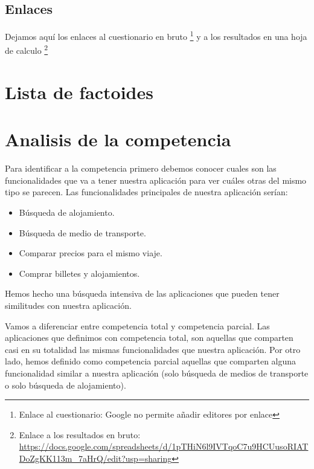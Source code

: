 \subsection{Enlaces}

Dejamos aquí los enlaces al cuestionario en bruto \footnote{Enlace al cuestionario: Google no permite añadir editores por enlace} y a los resultados en una hoja de calculo \footnote{ Enlace a los resultados en bruto: \url{https://docs.google.com/spreadsheets/d/1pTHiN6l9IVTqoC7u9HCUusoRIATDoZgKK113m_7aHrQ/edit?usp=sharing}}

\section{Lista de factoides}

\section{Analisis de la competencia}

Para identificar a la competencia primero debemos conocer cuales son las funcionalidades que va a tener nuestra aplicación para ver cuáles otras del mismo tipo se parecen. Las funcionalidades principales de nuestra aplicación serían:
\begin{itemize}
    \item Búsqueda de alojamiento.
    \item Búsqueda de medio de transporte.
    \item Comparar precios para el mismo viaje.
    \item Comprar billetes y alojamientos.
\end{itemize}

Hemos hecho una búsqueda intensiva de las aplicaciones que pueden tener similitudes con nuestra aplicación.

Vamos a diferenciar entre competencia total y competencia parcial. Las aplicaciones que definimos con competencia total, son aquellas que comparten casi en su totalidad las mismas funcionalidades que nuestra aplicación. Por otro lado, hemos definido como competencia parcial aquellas que comparten alguna funcionalidad similar a nuestra aplicación (solo búsqueda de medios de transporte o solo búsqueda de alojamiento).

